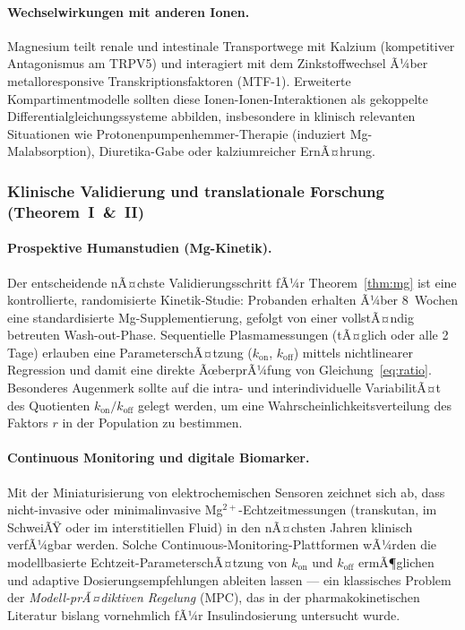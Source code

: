 ﻿\documentclass[12pt,a4paper]{article}
\theoremstyle{plain}
\theoremstyle{definition}
\theoremstyle{remark}
\begin{document}
\paragraph{Wechselwirkungen mit anderen Ionen.}
Magnesium teilt renale und intestinale Transportwege mit Kalzium
(kompetitiver Antagonismus am TRPV5) und interagiert mit dem
Zinkstoffwechsel Ã¼ber metalloresponsive Transkriptionsfaktoren (MTF-1).
Erweiterte Kompartimentmodelle sollten diese Ionen-Ionen-Interaktionen
als gekoppelte Differentialgleichungssysteme abbilden, insbesondere in
klinisch relevanten Situationen wie Protonenpumpenhemmer-Therapie
(induziert Mg-Malabsorption), Diuretika-Gabe oder kalziumreicher ErnÃ¤hrung.

\subsubsection{Klinische Validierung und translationale Forschung
  (Theorem~I~\&~II)}

\paragraph{Prospektive Humanstudien (Mg-Kinetik).}
Der entscheidende nÃ¤chste Validierungsschritt fÃ¼r Theorem~\ref{thm:mg} ist
eine kontrollierte, randomisierte Kinetik-Studie: Probanden erhalten Ã¼ber
8~Wochen eine standardisierte Mg-Supplementierung, gefolgt von einer
vollstÃ¤ndig betreuten Wash-out-Phase. Sequentielle Plasmamessungen (tÃ¤glich
oder alle 2 Tage) erlauben eine ParameterschÃ¤tzung ($k_\text{on}$,
$k_\text{off}$) mittels nichtlinearer Regression und damit eine direkte
ÃœberprÃ¼fung von Gleichung~\eqref{eq:ratio}. Besonderes Augenmerk sollte
auf die intra- und interindividuelle VariabilitÃ¤t des Quotienten
$k_\text{on}/k_\text{off}$ gelegt werden, um eine Wahrscheinlichkeitsverteilung
des Faktors $r$ in der Population zu bestimmen.

\paragraph{Continuous Monitoring und digitale Biomarker.}
Mit der Miniaturisierung von elektrochemischen Sensoren zeichnet sich ab,
dass nicht-invasive oder minimalinvasive Mg$^{2+}$-Echtzeitmessungen
(transkutan, im SchweiÃŸ oder im interstitiellen Fluid) in den nÃ¤chsten Jahren
klinisch verfÃ¼gbar werden. Solche Continuous-Monitoring-Plattformen wÃ¼rden
die modellbasierte Echtzeit-ParameterschÃ¤tzung von $k_\text{on}$ und
$k_\text{off}$ ermÃ¶glichen und adaptive Dosierungsempfehlungen ableiten lassen
--- ein klassisches Problem der \emph{Modell-prÃ¤diktiven Regelung} (MPC), das in
der pharmakokinetischen Literatur bislang vornehmlich fÃ¼r
Insulindosierung untersucht wurde.
\end{document}
